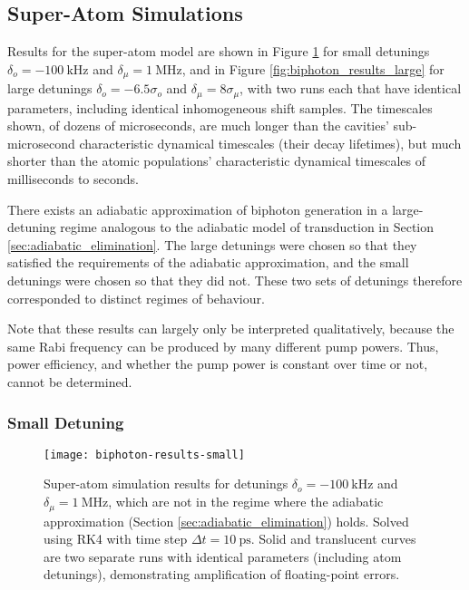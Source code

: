 \subsection{Super-Atom Simulations}
Results for the super-atom model are shown in Figure \ref{fig:biphoton_results_small} for small detunings $\delta_o = \qty{-100}{\kilo\hertz}$ and $\delta_\mu = \qty{1}{\mega\hertz}$, and in Figure \ref{fig:biphoton_results_large} for large detunings $\delta_o = -6.5\sigma_o$ and $\delta_\mu = 8\sigma_\mu$, with two runs each that have identical parameters, including identical inhomogeneous shift samples. The timescales shown, of dozens of microseconds, are much longer than the cavities' sub-microsecond characteristic dynamical timescales (their decay lifetimes), but much shorter than the atomic populations' characteristic dynamical timescales of milliseconds to seconds.

There exists an adiabatic approximation of biphoton generation in a large-detuning regime\cite{rueda_2019} analogous to the adiabatic model of transduction in Section \ref{sec:adiabatic_elimination}. The large detunings were chosen so that they satisfied the requirements of the adiabatic approximation, and the small detunings were chosen so that they did not. These two sets of detunings therefore corresponded to distinct regimes of behaviour.

Note that these results can largely only be interpreted qualitatively, because the same Rabi frequency can be produced by many different pump powers. Thus, power efficiency, and whether the pump power is constant over time or not, cannot be determined.

\subsubsection{Small Detuning}
\begin{figure}[ht]
\centering
\texttt{[image: biphoton-results-small]}
\caption{\label{fig:biphoton_results_small} Super-atom simulation results for detunings $\delta_o = \qty{-100}{\kilo\hertz}$ and $\delta_\mu = \qty{1}{\mega\hertz}$, which are not in the regime where the adiabatic approximation (Section \ref{sec:adiabatic_elimination}) holds. Solved using RK4 with time step $\Delta t = \qty{10}{\pico\second}$. Solid and translucent curves are two separate runs with identical parameters (including atom detunings), demonstrating amplification of floating-point errors.}
\end{figure}

